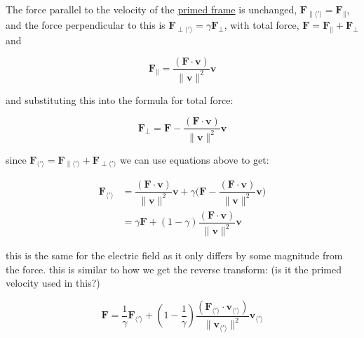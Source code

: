 The force parallel to the velocity of the \hyperlink{def-Primed-Frame}{primed frame} is unchanged, $\mathbf{F}_{\parallel \langle {'} \rangle} = \mathbf{F}_{\parallel}$, and the force perpendicular to this is $\mathbf{F}_{\perp \langle {'} \rangle} = {\gamma} \mathbf{F}_{\perp}$, with total force, $\mathbf{F} = \mathbf{F}_{\parallel} + \mathbf{F}_{\perp}$ and

\begin{equation}
	\mathbf{F}_{\parallel} = \dfrac{(\mathbf{F}\cdot\mathbf{v})}{\|\mathbf{v}\|^2}\mathbf{v}
\end{equation}

and substituting this into the formula for total force:

\begin{equation}
	\mathbf{F}_{\perp} = \mathbf{F}-\dfrac{(\mathbf{F}\cdot\mathbf{v})}{\|\mathbf{v}\|^2}\mathbf{v}
\end{equation}

since $\mathbf{F}_{\langle {'} \rangle} = \mathbf{F}_{\parallel \langle {'} \rangle} + \mathbf{F}_{\perp\langle {'} \rangle}$ we can use equations above to get:

\begin{equation}
	\begin{split}
		\mathbf{F}_{\langle {'} \rangle} & = \dfrac{(\mathbf{F}\cdot\mathbf{v})}{\|\mathbf{v}\|^2}\mathbf{v} + {\gamma}\bigg(\mathbf{F}-\dfrac{(\mathbf{F}\cdot\mathbf{v})}{\|\mathbf{v}\|^2}\mathbf{v}\bigg) \\
		                               & = {\gamma}\mathbf{F} + (1-{\gamma})\dfrac{(\mathbf{F}\cdot\mathbf{v})}{\|\mathbf{v}\|^2}\mathbf{v}
	\end{split}
\end{equation}

this is the same for the electric field as it only differs by some magnitude from the force.\newline
this is similar to how we get the reverse transform: (is it the primed velocity used in this?)

\begin{equation}
	\mathbf{F} = \dfrac{1}{{\gamma}}\mathbf{F}_{\langle {'} \rangle} + (1-\dfrac{1}{{\gamma}})\dfrac{(\mathbf{F}_{\langle {'} \rangle} \cdot\mathbf{v}_{\langle {'} \rangle} )}{\|\mathbf{v}_{\langle {'} \rangle} \|^2}\mathbf{v}_{\langle {'} \rangle}
\end{equation}

